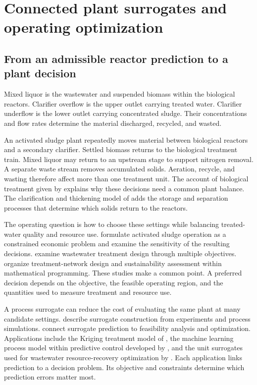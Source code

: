 \chapter{Connected plant surrogates and operating optimization}
\label{ch:plant}

\section{From an admissible reactor prediction to a plant decision}

Mixed liquor is the wastewater and suspended biomass within the biological reactors. Clarifier overflow is the upper outlet carrying treated water. Clarifier underflow is the lower outlet carrying concentrated sludge. Their concentrations and flow rates determine the material discharged, recycled, and wasted.

An activated sludge plant repeatedly moves material between biological reactors and a secondary clarifier. Settled biomass returns to the biological treatment train. Mixed liquor may return to an upstream stage to support nitrogen removal. A separate waste stream removes accumulated solids. Aeration, recycle, and wasting therefore affect more than one treatment unit. The account of biological treatment given by \citet{Henze2008} explains why these decisions need a common plant balance. The clarification and thickening model of \citet{HartelPopel1992} adds the storage and separation processes that determine which solids return to the reactors.

The operating question is how to choose these settings while balancing treated-water quality and resource use. \citet{Araujo2013} formulate activated sludge operation as a constrained economic problem and examine the sensitivity of the resulting decisions. \citet{PadronPaez2020} examine wastewater treatment design through multiple objectives. \citet{Aboagye2021} organize treatment-network design and sustainability assessment within mathematical programming. These studies make a common point. A preferred decision depends on the objective, the feasible operating region, and the quantities used to measure treatment and resource use.

A process surrogate can reduce the cost of evaluating the same plant at many candidate settings. \citet{McBride2019} describe surrogate construction from experiments and process simulations. \citet{BhosekarIerapetritou2018} connect surrogate prediction to feasibility analysis and optimization. Applications include the Kriging treatment model of \citet{He2023}, the machine learning process model within predictive control developed by \citet{Bernardelli2020}, and the unit surrogates used for wastewater resource-recovery optimization by \citet{Durkin2024}. Each application links prediction to a decision problem. Its objective and constraints determine which prediction errors matter most.

